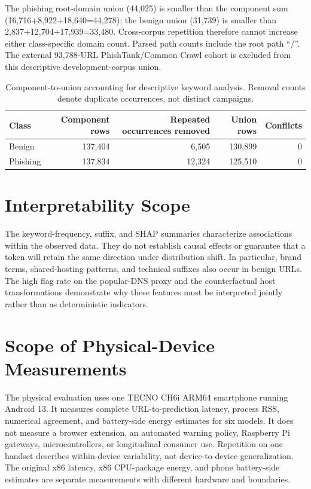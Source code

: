 \documentclass[10pt]{article}
\newenvironment{bluechange}{\color{black}}{}
\begin{document}
\begin{bluechange}
The phishing root-domain union (44,025) is smaller than the component sum (16,716+8,922+18,640=44,278); the benign union (31,739) is smaller than 2,837+12,704+17,939=33,480. Cross-corpus repetition therefore cannot increase either class-specific domain count. Parsed path counts include the root path ``/''. The external 93,788-URL PhishTank/Common Crawl cohort is excluded from this descriptive development-corpus union.
\end{bluechange}
\begin{table}[ht]
\centering\color{black}\small
\caption{Component-to-union accounting for descriptive keyword analysis. Removal counts denote duplicate occurrences, not distinct campaigns.}
\label{tab:corpus_flow}
\begin{tabular}{lrrrr}
\toprule
Class & Component rows & Repeated occurrences removed & Union rows & Conflicts \\
\midrule
Benign & 137,404 & 6,505 & 130,899 & 0 \\
Phishing & 137,834 & 12,324 & 125,510 & 0 \\
\bottomrule
\end{tabular}
\end{table}

\section{Interpretability Scope}

The keyword-frequency, suffix, and SHAP summaries characterize associations within the observed data. They do not establish causal effects or guarantee that a token will retain the same direction under distribution shift. In particular, brand terms, shared-hosting patterns, and technical suffixes also occur in benign URLs. The high flag rate on the popular-DNS proxy and the counterfactual host transformations demonstrate why these features must be interpreted jointly rather than as deterministic indicators.

\section{Scope of Physical-Device Measurements}
\begin{bluechange}
The physical evaluation uses one TECNO CH6i ARM64 smartphone running Android 13. It measures complete URL-to-prediction latency, process RSS, numerical agreement, and battery-side energy estimates for six models. It does not measure a browser extension, an automated warning policy, Raspberry Pi gateways, microcontrollers, or longitudinal consumer use. Repetition on one handset describes within-device variability, not device-to-device generalization. The original x86 latency, x86 CPU-package energy, and phone battery-side estimates are separate measurements with different hardware and boundaries.
\end{bluechange}
\end{document}
